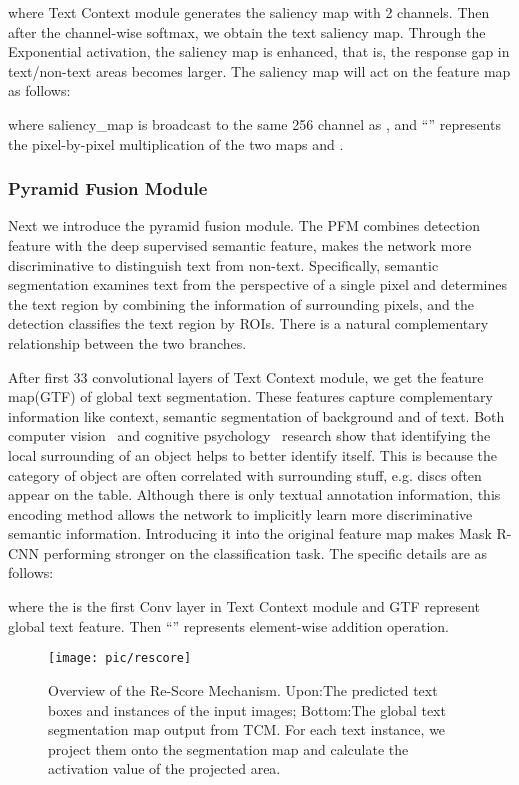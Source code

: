 \documentclass[letterpaper]{article} \usepackage{aaai19}  \usepackage{times}  \usepackage{helvet}  \usepackage{courier}  \usepackage{url}  \usepackage{graphicx}
\begin{document}
where Text Context module generates the saliency map with 2 channels. Then after the channel-wise softmax, we obtain the text saliency map. Through the Exponential activation, the saliency map is enhanced, that is, the response gap in text/non-text areas becomes larger.
The saliency map will act on the feature map as follows:



where saliency\_map is broadcast to the same 256 channel as , 
and ``'' represents the pixel-by-pixel multiplication of the two maps  and .


\subsubsection{Pyramid Fusion Module}
Next we introduce the pyramid fusion module.
The PFM combines detection feature with the deep supervised semantic feature, makes the network more discriminative to distinguish text from non-text.
Specifically, semantic segmentation examines text from the perspective of a single pixel and determines the text region by combining the information of surrounding pixels, and the detection classifies the text region by ROIs.
There is a natural complementary relationship between the two branches.

After first 33 convolutional layers of Text Context module, we get the feature map(GTF) of global text segmentation. 
These features capture complementary information like context, semantic segmentation of background and of text.
Both computer vision~\cite{divvala2009empirical} and cognitive psychology~\cite{oliva2007role} research show that identifying the local surrounding of an object helps to better identify itself. 
This is because the category of object are often correlated with surrounding stuff, e.g. discs often appear on the table. 
Although there is only textual annotation information, this encoding method allows the network to implicitly learn more discriminative semantic information.
Introducing it into the original feature map makes Mask R-CNN performing stronger on the classification task.
The specific details are as follows:



where the  is the first Conv layer in Text Context module and GTF represent global text feature. Then ``'' represents element-wise addition operation.



\begin{figure}[htp]
\centering
\texttt{[image: pic/rescore]}
\caption{\label{rescore}{Overview of the Re-Score Mechanism. Upon:The predicted text boxes and instances of the input images; Bottom:The global text segmentation map output from TCM. For each text instance, we project them onto the segmentation map and calculate the activation value of the projected area. }}
\end{figure}
\end{document}
